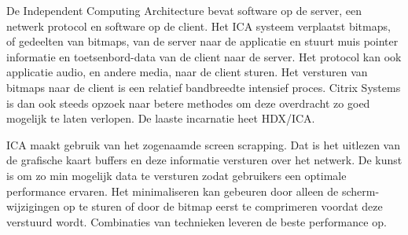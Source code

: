 De Independent Computing Architecture bevat software op de server, een netwerk protocol en software op de client. Het ICA systeem verplaatst bitmaps, of gedeelten van bitmaps, van de server naar de applicatie en stuurt muis pointer informatie en toetsenbord-data van de client naar de server. Het protocol kan ook applicatie audio, en andere media, naar de client sturen. Het versturen van bitmaps naar de client is een relatief bandbreedte intensief proces. Citrix Systems is dan ook steeds opzoek naar betere methodes om deze overdracht zo goed mogelijk te laten verlopen. De laaste incarnatie heet HDX/ICA.

ICA maakt gebruik van het zogenaamde screen scrapping. Dat is het uitlezen van de grafische kaart buffers en deze informatie versturen over het netwerk. De kunst is om zo min mogelijk data te versturen zodat gebruikers een optimale performance ervaren. Het minimaliseren kan gebeuren door alleen de scherm-wijzigingen op te sturen of door de bitmap eerst te comprimeren voordat deze verstuurd wordt. Combinaties van technieken leveren de beste performance op.
